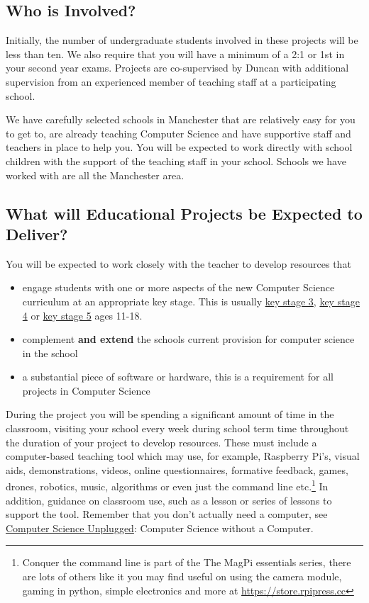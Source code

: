 \documentclass[
  12pt,
]{book}
\providecommand{\tightlist}{%
  \setlength{\itemsep}{0pt}\setlength{\parskip}{0pt}}
\begin{document}
\subsection{Who is Involved?}\label{who-is-involved}

Initially, the number of undergraduate students involved in these projects will be less than ten. We also require that you will have a minimum of a 2:1 or 1st in your second year exams. Projects are co-supervised by Duncan with additional supervision from an experienced member of teaching staff at a participating school.

We have carefully selected schools in Manchester that are relatively easy for you to get to, are already teaching Computer Science and have supportive staff and teachers in place to help you. You will be expected to work directly with school children with the support of the teaching staff in your school. Schools we have worked with are all the Manchester area.

\subsection{What will Educational Projects be Expected to Deliver?}\label{what-will-educational-projects-be-expected-to-deliver}

You will be expected to work closely with the teacher to develop resources that

\begin{itemize}
\tightlist
\item
  engage students with one or more aspects of the new Computer Science curriculum at an appropriate key stage. This is usually \href{https://en.wikipedia.org/wiki/Key_Stage_3}{key stage 3}, \href{https://en.wikipedia.org/wiki/Key_Stage_4}{key stage 4} or \href{https://en.wikipedia.org/wiki/Key_Stage_5}{key stage 5} ages 11-18.
\item
  complement \textbf{and extend} the schools current provision for computer science in the school
\item
  a substantial piece of software or hardware, this is a requirement for all projects in Computer Science
\end{itemize}

During the project you will be spending a significant amount of time in the classroom, visiting your school every week during school term time throughout the duration of your project to develop resources. These must include a computer-based teaching tool which may use, for example, Raspberry Pi's, visual aids, demonstrations, videos, online questionnaires, formative feedback, games, drones, robotics, music, \citep{Aaron2016} algorithms \citep{Kubica2012} or even just the command line \citep{conquerthecommandline} etc.\footnote{Conquer the command line is part of the The MagPi essentials series, there are lots of others like it you may find useful on using the camera module, gaming in python, simple electronics and more at \url{https://store.rpipress.cc}} In addition, guidance on classroom use, such as a lesson or series of lessons to support the tool. Remember that you don't actually need a computer, see \href{https://csunplugged.org}{Computer Science Unplugged}: Computer Science without a Computer. \citep{Bell2018}
\end{document}
